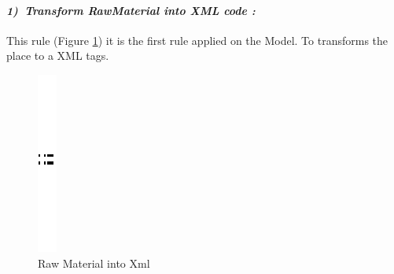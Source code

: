\paragraph{\emph{1)~Transform RawMaterial into XML code :} }
This rule (Figure \ref{fig:Raw Material into Xml}) it is the first rule applied on the Model. To transforms the place to a XML
tags.
\begin{figure}[th]
\centering

\quad{}
\includegraphics{ch3/img/sep}
\quad{}
 
 
\caption{\label{fig:Raw Material into Xml}Raw Material into Xml} 

\end{figure} 

